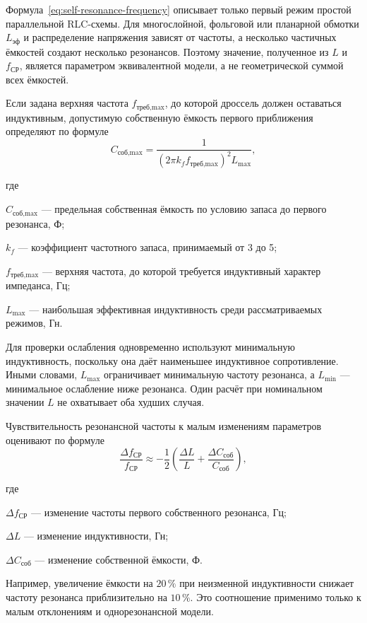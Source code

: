 \documentclass[14pt,a4paper]{extarticle}
\newenvironment{whereblock}
 {\par\noindent где\par
  \begin{list}{}{\setlength{\leftmargin}{12.5mm}
                  \setlength{\itemindent}{-12.5mm}
                  \setlength{\itemsep}{0pt}
                  \setlength{\parsep}{0pt}
                  \setlength{\topsep}{0pt}}}
 {\end{list}}
\newcommand{\whereitem}[2]{\item[] #1 --- #2}
\begin{document}
Формула~\eqref{eq:self-resonance-frequency} описывает только первый режим
простой параллельной RLC-схемы. Для многослойной, фольговой или планарной
обмотки $L_{\text{эф}}$ и распределение напряжения зависят от частоты, а
несколько частичных ёмкостей создают несколько резонансов. Поэтому значение,
полученное из $L$ и $f_{\text{СР}}$, является параметром эквивалентной модели,
а не геометрической суммой всех ёмкостей.

Если задана верхняя частота $f_{\text{треб,max}}$, до которой дроссель должен
оставаться индуктивным, допустимую собственную ёмкость первого приближения
определяют по формуле
\begin{equation}
 C_{\text{соб,max}}=
 \frac{1}{\left(2\pi k_f f_{\text{треб,max}}\right)^2L_{\max}},
 \label{eq:max-self-capacitance}
\end{equation}
\begin{whereblock}
\whereitem{$C_{\text{соб,max}}$}{предельная собственная ёмкость по условию
запаса до первого резонанса, Ф;}
\whereitem{$k_f$}{коэффициент частотного запаса, принимаемый от 3 до 5;}
\whereitem{$f_{\text{треб,max}}$}{верхняя частота, до которой требуется
индуктивный характер импеданса, Гц;}
\whereitem{$L_{\max}$}{наибольшая эффективная индуктивность среди
рассматриваемых режимов, Гн.}
\end{whereblock}

Для проверки ослабления одновременно используют минимальную индуктивность,
поскольку она даёт наименьшее индуктивное сопротивление. Иными словами,
$L_{\max}$ ограничивает минимальную частоту резонанса, а $L_{\min}$ ---
минимальное ослабление ниже резонанса. Один расчёт при номинальном значении
$L$ не охватывает оба худших случая.

Чувствительность резонансной частоты к малым изменениям параметров оценивают
по формуле
\begin{equation}
 \frac{\Delta f_{\text{СР}}}{f_{\text{СР}}}\approx
 -\frac{1}{2}
 \left(
 \frac{\Delta L}{L}+\frac{\Delta C_{\text{соб}}}{C_{\text{соб}}}
 \right),
 \label{eq:self-resonance-sensitivity}
\end{equation}
\begin{whereblock}
\whereitem{$\Delta f_{\text{СР}}$}{изменение частоты первого собственного
резонанса, Гц;}
\whereitem{$\Delta L$}{изменение индуктивности, Гн;}
\whereitem{$\Delta C_{\text{соб}}$}{изменение собственной ёмкости, Ф.}
\end{whereblock}

Например, увеличение ёмкости на $20\,\%$ при неизменной индуктивности снижает
частоту резонанса приблизительно на $10\,\%$. Это соотношение применимо только
к малым отклонениям и однорезонансной модели.
\end{document}

